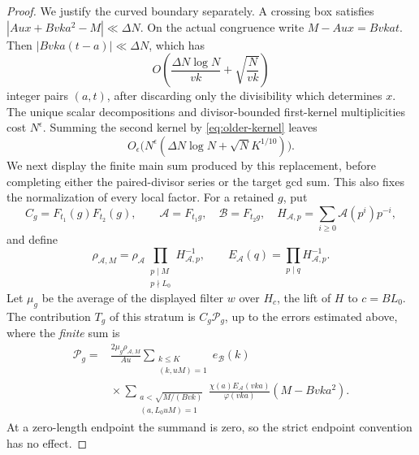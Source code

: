 \begin{proof}
We justify the curved boundary separately.  A crossing box satisfies
\(|Au x+Bvka^2-M|\ll\Delta N\).
On the actual congruence write \(M-Au x=Bvkat\).
Then \(|Bvka(t-a)|\ll\Delta N\), which has
\[
 O\left(\frac{\Delta N\log N}{vk}+\sqrt{\frac N{vk}}\right)
\]
integer pairs \((a,t)\), after discarding only the divisibility
which determines \(x\).
The unique scalar decompositions and divisor-bounded first-kernel
multiplicities cost \(N^\epsilon\).
Summing the second kernel by \eqref{eq:older-kernel} leaves
\begin{equation}\label{eq:older-boundary}
 O_\epsilon\big(N^\epsilon(\Delta N\log N+\sqrt N K^{1/10})\big).
\end{equation}
We next display the finite main sum produced by this replacement,
before completing either the paired-divisor series or the target gcd
sum.  This also fixes the normalization of every local factor.
For a retained \(g\), put
\[
 C_g=F_{t_1}(g)F_{t_2}(g),\qquad
 \mathcal A=F_{t_1g},\quad \mathcal B=F_{t_2g},\quad
 H_{\mathcal A,p}=\sum_{i\ge0}\mathcal A(p^i)p^{-i},
\]
and define
\[
 \rho_{\mathcal A,M}
   =\rho_{\mathcal A}
       \prod_{\substack{p\mid M\\p\nmid L_0}}H_{\mathcal A,p}^{-1},
 \qquad
 E_{\mathcal A}(q)=\prod_{p\mid q}H_{\mathcal A,p}^{-1}.
\]
Let \(\mu_g\) be the average of the displayed filter \(w\) over
\(H_c\), the lift of \(H\) to \(c=BL_0\).
The contribution \(T_g\) of this stratum is \(C_g\mathcal P_g\),
up to the errors estimated above, where the \emph{finite} sum is
\begin{equation}\label{eq:older-finite-main}
 \begin{aligned}
 \mathcal P_g={}&
 \frac{2\mu_g\rho_{\mathcal A,M}}{Au}
 \sum_{\substack{k\le K\\(k,uM)=1}}e_{\mathcal B}(k)\\
 &{}\times
 \sum_{\substack{a<\sqrt{M/(Bvk)}\\(a,L_0uM)=1}}
 \frac{\chi(a)E_{\mathcal A}(vka)}{\varphi(vka)}
                         (M-Bvka^2).
 \end{aligned}
\end{equation}
At a zero-length endpoint the summand is zero, so the strict
endpoint convention has no effect.


\end{proof}
